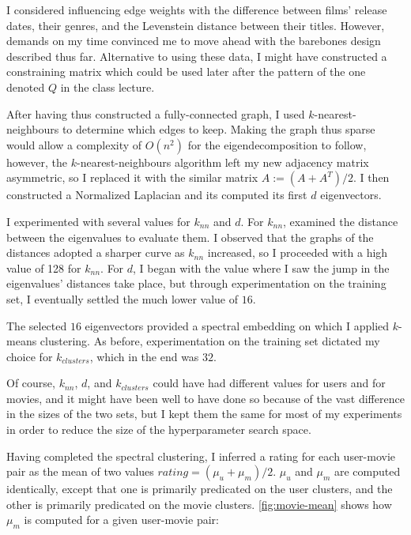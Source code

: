 \documentclass{article}
\begin{document}
    I considered influencing edge weights with the difference between films' release dates, their genres, and the Levenstein distance between their titles. However, demands on my time convinced me to move ahead with the barebones design described thus far. Alternative to using these data, I might have constructed a constraining matrix which could be used later after the pattern of the one denoted $Q$ in the class lecture.
    
    After having thus constructed a fully-connected graph, I used $k$-nearest-neighbours to determine which edges to keep. Making the graph thus sparse would allow a complexity of $O(n^2)$ for the eigendecomposition to follow, however, the $k$-nearest-neighbours algorithm left my new adjacency matrix asymmetric, so I replaced it with the similar matrix $A := (A+A^T) / 2$. I then constructed a Normalized Laplacian and its computed its first $d$ eigenvectors.
    
    
    I experimented with several values for $k_{nn}$ and $d$. For $k_{nn}$, examined the distance between the eigenvalues to evaluate them. I observed that the graphs of the distances adopted a sharper curve as $k_{nn}$ increased, so I proceeded with a high value of 128 for $k_{nn}$. For $d$, I began with the value where I saw the jump in the eigenvalues' distances take place, but through experimentation on the training set, I eventually settled the much lower value of $16$.
    
    The selected $16$ eigenvectors provided a spectral embedding on which I applied $k$-means clustering. As before, experimentation on the training set dictated my choice for $k_{clusters}$, which in the end was $32$.
    
    Of course, $k_{nn}$, $d$, and $k_{clusters}$ could have had different values for users and for movies, and it might have been well to have done so because of the vast difference in the sizes of the two sets, but I kept them the same for most of my experiments in order to reduce the size of the hyperparameter search space.
    
    Having completed the spectral clustering, I inferred a rating for each user-movie pair as the mean of two values $rating = (\mu_u + \mu_m) / 2$.
    $\mu_u$ and $\mu_m$ are computed identically, except that one is primarily predicated on the user clusters, and the other is primarily predicated on the movie clusters. \ref{fig:movie-mean} shows how $\mu_m$ is computed for a given user-movie pair:
    
\end{document}
